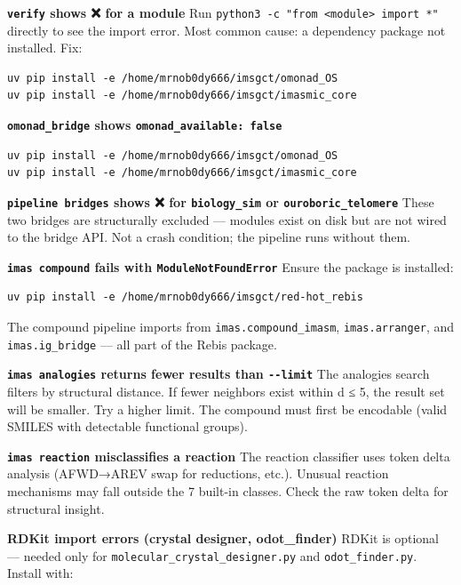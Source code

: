 \documentclass[12pt,a4paper]{article}
\begin{document}
\textbf{\texttt{verify} shows ❌ for a module} Run
\texttt{python3\ -c\ "from\ \textless{}module\textgreater{}\ import\ *"}
directly to see the import error. Most common cause: a dependency
package not installed. Fix:

\begin{verbatim}
uv pip install -e /home/mrnob0dy666/imsgct/omonad_OS
uv pip install -e /home/mrnob0dy666/imsgct/imasmic_core
\end{verbatim}

\textbf{\texttt{omonad\_bridge} shows
\texttt{omonad\_available:\ false}}

\begin{verbatim}
uv pip install -e /home/mrnob0dy666/imsgct/omonad_OS
uv pip install -e /home/mrnob0dy666/imsgct/imasmic_core
\end{verbatim}

\textbf{\texttt{pipeline\ bridges} shows ❌ for \texttt{biology\_sim} or
\texttt{ouroboric\_telomere}} These two bridges are structurally
excluded --- modules exist on disk but are not wired to the bridge API.
Not a crash condition; the pipeline runs without them.

\textbf{\texttt{imas\ compound} fails with \texttt{ModuleNotFoundError}}
Ensure the package is installed:

\begin{verbatim}
uv pip install -e /home/mrnob0dy666/imsgct/red-hot_rebis
\end{verbatim}

The compound pipeline imports from \texttt{imas.compound\_imasm},
\texttt{imas.arranger}, and \texttt{imas.ig\_bridge} --- all part of the
Rebis package.

\textbf{\texttt{imas\ analogies} returns fewer results than
\texttt{-\/-limit}} The analogies search filters by structural distance.
If fewer neighbors exist within d ≤ 5, the result set will be smaller.
Try a higher limit. The compound must first be encodable (valid SMILES
with detectable functional groups).

\textbf{\texttt{imas\ reaction} misclassifies a reaction} The reaction
classifier uses token delta analysis (AFWD→AREV swap for reductions,
etc.). Unusual reaction mechanisms may fall outside the 7 built-in
classes. Check the raw token delta for structural insight.

\textbf{RDKit import errors (crystal designer, odot\_finder)} RDKit is
optional --- needed only for \texttt{molecular\_crystal\_designer.py}
and \texttt{odot\_finder.py}. Install with:
\end{document}
